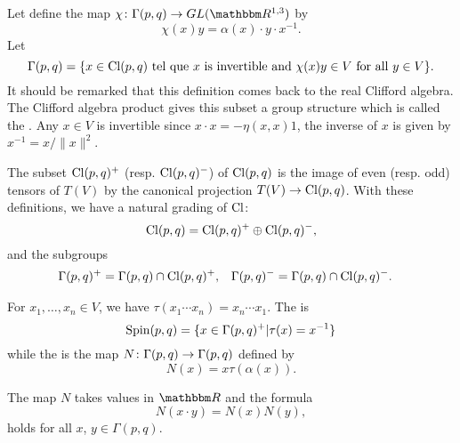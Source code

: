 Let define the map $\dpt{\chi}{\Gamma(p,q)}{GL(\eR^{1,3})}$ by 
\begin{equation}
                \chi(x)y=\alpha(x)\cdot y\cdot x^{-1}.
\end{equation}
Let
\[
 \Gamma(p,q)=\{x\in\operatorname{Cl}(p,q)\text{ tel que }\textrm{$x$ is invertible and }  \chi(x)y  \in V\textrm{ for all $y\in V$}\}.
\]
It should be remarked that this definition comes back to the real Clifford algebra. The Clifford algebra product gives this subset a group structure which is called the . Any $x\in V$ is invertible since $x\cdot x=-\eta(x,x)1$, the inverse of $x$ is given by $x^{-1}=x/\|x\|^2$.

The subset $\operatorname{Cl}(p,q)^+$ (resp. $\operatorname{Cl}(p,q)^-$) of $\operatorname{Cl}(p,q)$ is the image of even (resp. odd) tensors of $T(V)$ by the canonical projection $T(V)\to\operatorname{Cl}(p,q)$. With these definitions, we have a natural grading of $\operatorname{Cl}$:
\begin{equation}
 \label{directC}\operatorname{Cl}(p,q)=\operatorname{Cl}(p,q)^+\oplus\operatorname{Cl}(p,q)^-,
 \end{equation}
and the subgroups
\begin{align}
\label{defgplus}
\Gamma(p,q)^+&=\Gamma(p,q)\cap\operatorname{Cl}(p,q)^+,&\Gamma(p,q)^-&=\Gamma(p,q)\cap\operatorname{Cl}(p,q)^-.
\end{align}

For $x_1,\ldots,x_n\in V$, we have $\tau(x_1\cdots x_n)=x_n\cdots x_1$.  The  is
\begin{equation}   \label{defSpinun}
 \operatorname{Spin}(p,q)=\{x\in\Gamma(p,q)^+\vert\tau(x)=x^{-1}\}
\end{equation}
while the  is the map $N\colon \Gamma(p,q)\to \Gamma(p,q)$ defined by
\[
 N(x)=x\tau(\alpha(x)).
\]

\begin{proposition} \label{proppourN}
The map $N$ takes values in $\eR$ and the formula
\begin{equation}
             N(x\cdot y)=N(x)N(y),
\end{equation}
holds for all $x$, $y\in\Gamma(p,q)$.
\end{proposition}

